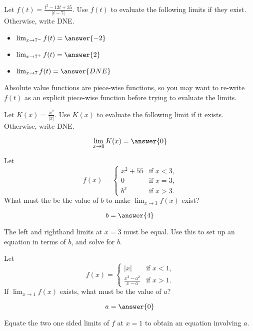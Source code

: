 \documentclass[handout]{ximera}
\begin{document}
\begin{exercise}
Let $f(t) = \frac{t^2 - 12t +35}{|t-7|}$.  Use $f(t)$ to evaluate the following limits if they exist.  Otherwise, write DNE.

\begin{itemize}

\item [] $\lim_{x \to 7^-} f(t) = \answer{-2}$

\item [] $\lim_{x \to 7^+} f(t) = \answer{2}$

\item [] $\lim_{x \to 7} f(t) = \answer{DNE}$

\end{itemize}

\begin{hint}
Absolute value functions are piece-wise functions, so you may want to re-write $f(t)$ as an explicit piece-wise function before trying to evaluate the limits. 
\end{hint}

\end{exercise}

\begin{exercise}
Let $K(x) = \frac{x^2}{|x|}$.  Use $K(x)$ to evaluate the following limit if it exists.  Otherwise, write DNE.

\[
\lim_{x \to 0} K(x) = \answer{0}
\]

\end{exercise}

\begin{exercise}
Let
\[
f(x) =
\begin{cases} x^2+55 &\text{if $x<3$,}\\
  0 &\text{if $x=3$,} \\
  b^x &\text{if $x>3$.}
\end{cases}
\]  
What must the be the value of $b$ to make $\displaystyle\lim_{x \to 3} f(x)$ exist?

\[
b = \answer{4}
\]

\begin{hint}
  The left and righthand limits at $x=3$ must be equal.  Use this to
  set up an equation in terms of $b$, and solve for $b$.
\end{hint}
\end{exercise}

\begin{exercise}
Let
\[
f(x) = \begin{cases}
  |x| &\text{if $x<1$,} \\
  \frac{x^2-a^2}{x-a} &\text{if $x>1$.}
\end{cases}
\]
If $\displaystyle\lim_{x \to 1} f(x)$ exists, what must be the value of $a$?

  \[
a = \answer{0}
\]

\begin{hint}
  Equate the two one sided limits of $f$ at $x=1$ to obtain an equation involving $a$.
\end{hint}

\end{exercise}
\end{document}
